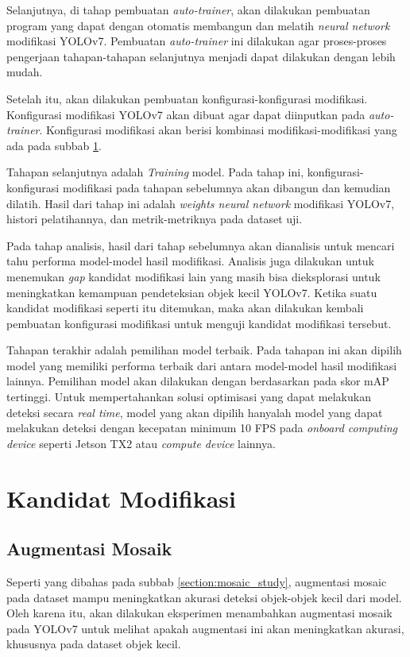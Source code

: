   Selanjutnya, di tahap pembuatan \emph{auto-trainer}, akan dilakukan pembuatan program yang dapat dengan otomatis membangun dan melatih \emph{neural network} modifikasi YOLOv7.
  Pembuatan \emph{auto-trainer} ini dilakukan agar proses-proses pengerjaan tahapan-tahapan selanjutnya menjadi dapat dilakukan dengan lebih mudah.

  Setelah itu, akan dilakukan pembuatan konfigurasi-konfigurasi modifikasi.
  Konfigurasi modifikasi YOLOv7 akan dibuat agar dapat diinputkan pada \emph{auto-trainer}.
  Konfigurasi modifikasi akan berisi kombinasi modifikasi-modifikasi yang ada pada subbab \ref{section:modificationcandidates}.

  Tahapan selanjutnya adalah \emph{Training} model.
  Pada tahap ini, konfigurasi-konfigurasi modifikasi pada tahapan sebelumnya akan dibangun dan kemudian dilatih.
  Hasil dari tahap ini adalah \emph{weights neural network} modifikasi YOLOv7, histori pelatihannya, dan metrik-metriknya pada dataset uji.

  Pada tahap analisis, hasil dari tahap sebelumnya akan dianalisis untuk mencari tahu performa model-model hasil modifikasi.
  Analisis juga dilakukan untuk menemukan \emph{gap} kandidat modifikasi lain yang masih bisa dieksplorasi untuk meningkatkan kemampuan pendeteksian objek kecil YOLOv7.
  Ketika suatu kandidat modifikasi seperti itu ditemukan, maka akan dilakukan kembali pembuatan konfigurasi modifikasi untuk menguji kandidat modifikasi tersebut.

  Tahapan terakhir adalah pemilihan model terbaik.
  Pada tahapan ini akan dipilih model yang memiliki performa terbaik dari antara model-model hasil modifikasi lainnya.
  Pemilihan model akan dilakukan dengan berdasarkan pada skor mAP tertinggi.
  Untuk mempertahankan solusi optimisasi yang dapat melakukan deteksi secara \emph{real time}, model yang akan dipilih hanyalah model yang dapat melakukan deteksi dengan kecepatan minimum 10 FPS pada \emph{onboard computing device} seperti Jetson TX2 atau \emph{compute device} lainnya.


\section{Kandidat Modifikasi}
\label{section:modificationcandidates}
  \subsection{Augmentasi Mosaik}
    Seperti yang dibahas pada subbab \ref{section:mosaic_study}, augmentasi mosaic pada dataset mampu meningkatkan akurasi deteksi objek-objek kecil dari model.
    Oleh karena itu, akan dilakukan eksperimen menambahkan augmentasi mosaik pada YOLOv7 untuk melihat apakah augmentasi ini akan meningkatkan akurasi, khususnya pada dataset objek kecil.
